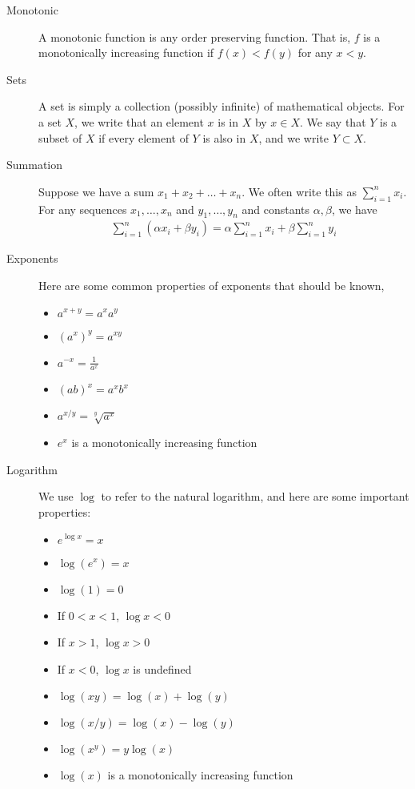 \begin{description}
    \item[Monotonic] A monotonic function is any order preserving function. That is, $f$ is a monotonically increasing function if $f(x) < f(y)$ for any $x < y$. 
    \item[Sets] A set is simply a collection (possibly infinite) of mathematical objects. For a set $X$, we write that an element $x$ is in $X$ by $x \in X$. We say that $Y$ is a subset of $X$ if every element of $Y$ is also in $X$, and we write $Y \subset X$.  
    \item[Summation] Suppose we have a sum $x_1 + x_2 + \dots + x_n$. We often write this as $\sum_{i = 1}^n x_i$. For any sequences $x_1, \dots, x_n$ and $y_1, \dots, y_n$ and constants $\alpha, \beta$, we have
    \begin{align*}
        \sum_{i = 1}^n (\alpha x_i + \beta y_i) = \alpha \sum_{i = 1}^n x_i + \beta \sum_{i = 1}^n y_i
    \end{align*} 
    \item[Exponents] Here are some common properties of exponents that should be known,
    \begin{itemize}
        \item $a^{x + y} = a^x a^y$
        \item $(a^x)^y = a^{xy}$
        \item $a^{-x} = \frac{1}{a^{x}}$
        \item $(ab)^x = a^x b^x$
        \item $a^{x/y} = \sqrt[y]{a^x}$
        \item $e^x$ is a monotonically increasing function
    \end{itemize}
    
    \item[Logarithm] We use $\log$ to refer to the natural logarithm, and here are some important properties:
    \begin{itemize}
        \item $e^{\log x} = x$
        \item $\log(e^x) = x$
        \item $\log(1) = 0$
        \item If $0 < x < 1$, $\log x < 0$
        \item If $x > 1$, $\log x > 0$
        \item If $x < 0$, $\log x$ is undefined
        \item $\log(xy) = \log(x) + \log(y)$
        \item $\log(x/y) = \log(x) - \log(y)$
        \item $\log(x^y) = y \log(x)$
        \item $\log(x)$ is a monotonically increasing function
    \end{itemize} 
\end{description}

